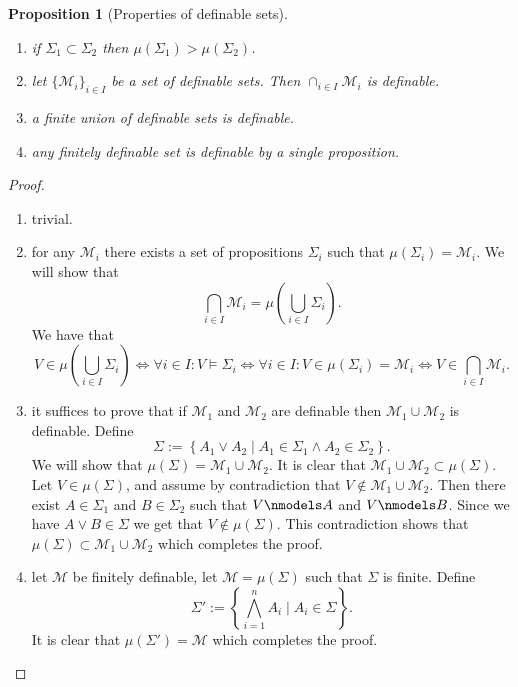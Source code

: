\documentclass[11pt,a4paper]{article}
\theoremstyle{definition}
\theoremstyle{plain}
\newtheorem{proposition}[theorem]{Proposition}
\newcommand{\set}[2]{ \left\{ #1 \mid #2 \right\} }
\begin{document}
  \begin{proposition}[Properties of definable sets]
    \begin{enumerate}
      \item[(1)] if $\Sigma_1 \subset \Sigma_2$ then
        $\mu(\Sigma_1) > \mu(\Sigma_2)$.
      \item[(2)] let $\{\mathcal M_i\}_{i \in I}$ be a set of definable sets.
        Then $\cap_{i \in I} \mathcal M_i$ is definable.
      \item[(3)] a finite union of definable sets is definable.
      \item[(4)] any finitely definable set is definable by a single
        proposition.
    \end{enumerate}
  \end{proposition}
  \begin{proof}
    \begin{enumerate}
      \item[(1)] trivial.
      \item[(2)] for any $\mathcal M_i$ there exists a set of propositions
        $\Sigma_i$ such that $\mu(\Sigma_i) = \mathcal M_i$.
        We will show that
        \[
          \bigcap_{i \in I} \mathcal M_i =
          \mu\left(\bigcup_{i \in I} \Sigma_i\right).
        \]
        We have that
        \[
          V \in \mu\left(\bigcup_{i \in I} \Sigma_i\right) \iff
          \forall i \in I \colon V \models \Sigma_i \iff
          \forall i \in I \colon V \in \mu(\Sigma_i) = \mathcal M_i \iff
          V \in \bigcap_{i \in I} \mathcal M_i.
        \]
      \item[(3)] it suffices to prove that if $\mathcal M_1$ and
        $\mathcal M_2$ are definable then $\mathcal M_1 \cup \mathcal M_2$
        is definable. Define
        \[
          \Sigma := \set{A_1 \lor A_2}{A_1 \in \Sigma_1 \land A_2 \in \Sigma_2}.
        \]
        We will show that $\mu(\Sigma) = \mathcal M_1 \cup \mathcal M_2$.
        It is clear that $\mathcal M_1 \cup \mathcal M_2 \subset \mu(\Sigma)$.
        Let $V \in \mu(\Sigma)$, and assume by contradiction that
        $V \notin \mathcal M_1 \cup \mathcal M_2$.
        Then there exist $A \in \Sigma_1$ and $B \in \Sigma_2$ such that
        $V \nmodels A$ and $V \nmodels B$.
        Since we have $A \lor B \in \Sigma$ we get that $V \notin \mu(\Sigma)$.
        This contradiction shows that
        $\mu(\Sigma) \subset \mathcal M_1 \cup \mathcal M_2$
        which completes the proof.
      \item[(4)] let $\mathcal M$ be finitely definable, let 
        $\mathcal M = \mu(\Sigma)$ such that $\Sigma$ is finite.
        Define
        \[
          \Sigma' := \set{\bigwedge_{i=1}^{n} A_i}{A_i \in \Sigma}.
        \]
        It is clear that $\mu(\Sigma') = \mathcal M$ which completes the
        proof.
    \end{enumerate}
  \end{proof}
\end{document}
